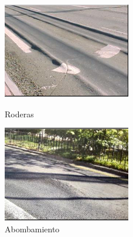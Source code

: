 \begin{figure}[ht!]
	\centering
	\begin{minipage}{0.3\linewidth}
		\centering
		\includegraphics[width=\linewidth]{figs/rod.png}
		\caption*{\centering Roderas }
	\end{minipage}
	\hspace{0.5 cm}
	\begin{minipage}{0.3\linewidth}
		\centering
		\includegraphics[width=\linewidth]{figs/abo.png}
		\caption*{\centering Abombamiento }
	\end{minipage}
	\hspace{0.5 cm}
	\begin{minipage}{0.3\linewidth}

\end{minipage}
\end{figure}
